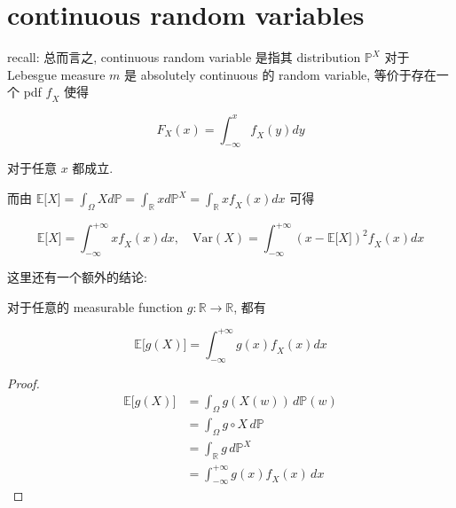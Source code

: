 \section{continuous random variables}\label{continuous-random-variables}

recall: 总而言之, continuous random variable 是指其 distribution \(\mathbb{P}^{\mathit{X}}\) 对于 Lebesgue measure \(\mathit{m}\) 是 absolutely continuous 的 random variable, 等价于存在一个 pdf \(\mathit{f}_{\mathit{X}}\) 使得

\[\mathit{F}_{\mathit{X}}(\mathit{x}) = \int_{- \infty}^{\mathit{x}}\mathit{f}_{\mathit{X}}(\mathit{y})\mathit{d}\mathit{y}\]

对于任意 \(\mathit{x}\) 都成立.

而由 \(\mathbb{E}\lbrack\mathit{X}\rbrack = \int_{\Omega}\mathit{X}\mathit{d}\mathbb{P} = \int_{\mathbb{R}}\mathit{x}\mathit{d}\mathbb{P}^{\mathit{X}} = \int_{\mathbb{R}}\mathit{x}\mathit{f}_{\mathit{X}}(\mathit{x})\mathit{d}\mathit{x}\) 可得

\[\mathbb{E}\lbrack\mathit{X}\rbrack = \int_{- \infty}^{+ \infty}\mathit{x}\mathit{f}_{\mathit{X}}(\mathit{x})\mathit{d}\mathit{x},\quad\text{Var}(\mathit{X}) = \int_{- \infty}^{+ \infty}(\mathit{x} - \mathbb{E}\lbrack\mathit{X}\rbrack)^{2}\mathit{f}_{\mathit{X}}(\mathit{x})\mathit{d}\mathit{x}\]

这里还有一个额外的结论:

\begin{proposition}

对于任意的 measurable function \(\mathit{g}:\mathbb{R}\rightarrow\mathbb{R}\), 都有

\[\mathbb{E}\lbrack\mathit{g}(\mathit{X})\rbrack = \int_{- \infty}^{+ \infty}\mathit{g}(\mathit{x})\mathit{f}_{\mathit{X}}(\mathit{x})\mathit{d}\mathit{x}\]

\end{proposition}

\begin{proof}

\[\begin{matrix}
{\mathbb{E}\lbrack\mathit{g}(\mathit{X})\rbrack} & {= \int_{\Omega}\mathit{g}(\mathit{X}(\mathit{w}))\,\mathit{d}\mathbb{P}(\mathit{w})} \\
 & {= \int_{\Omega}\mathit{g} \circ \mathit{X}\,\mathit{d}\mathbb{P}} \\
 & {= \int_{\mathbb{R}}\mathit{g}\,\mathit{d}\mathbb{P}^{\mathit{X}}} \\
 & {= \int_{- \infty}^{+ \infty}\mathit{g}(\mathit{x})\mathit{f}_{\mathit{X}}(\mathit{x})\,\mathit{d}\mathit{x}}
\end{matrix}\]

\end{proof}

